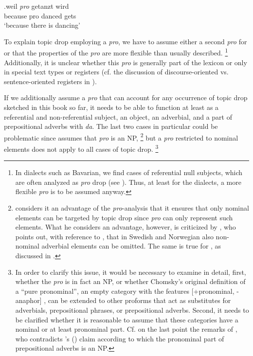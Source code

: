 \exg.\label{ex:pro.sternefeld}weil \emph{pro} getanzt wird\\
because pro danced gets\\
`because there is dancing' \citep[170]{sternefeld2015}

To explain topic drop employing a \textit{pro}, we have to assume either a second \textit{pro} for  or that the properties of the  \textit{pro} are more flexible than usually described.%
\footnote{In  dialects such as Bavarian, we find cases of referential null subjects,  which are often analyzed as \textit{pro} drop (see ).
Thus, at least for the dialects, a more flexible \textit{pro} is to be assumed anyway.}
%
Additionally, it is unclear whether this \textit{pro} is generally part of the lexicon or only in special text types  or registers (cf. the discussion of discourse-oriented vs. sentence-oriented registers in ).

If we additionally assume a \textit{pro} that can account for any occurrence of topic drop sketched in this book so far, it needs to be able to function at least as a referential and non-referential subject, an object, an adverbial,  and a part of prepositional adverbs with \textit{da}.
The last two cases in particular could be problematic since \citet[101]{platzack1996} assumes that \textit{pro} is an NP,%
\footnote{\citet[101]{platzack1996} considers it an advantage of the \textit{pro}-analysis that it ensures that only nominal elements can be targeted by topic drop since \textit{pro} can only represent such elements.
What he considers an advantage, however, is criticized by \citet[38]{nygard2018}, who points out, 	with reference to \citet{mornsjo2002}, that in Swedish  and Norwegian  also non-nominal adverbial  elements can be omitted.
The same is true for , as discussed in .}
%
but a \textit{pro} restricted to nominal elements does not apply to all cases of topic drop.%
\footnote{In order to clarify this issue, it would be necessary to examine in detail, first, whether the \textit{pro} is in fact an NP, or  whether Chomsky's original definition of a ``pure pronominal'', an empty category with the features [+pronominal, -anaphor] \citep[81--82]{chomsky1982}, can be extended to other proforms that act as substitutes for adverbials,   prepositional phrases, or prepositional adverbs. 
Second, it needs to be clarified whether it is reasonable to assume that these categories have a nominal or at least pronominal part.
Cf. on the last point the remarks of \citet[162, footnote 6]{oppenrieder1991}, who contradicts \citeauthor{wunderlich1984}'s (\citeyear[88]{wunderlich1984}) claim according to which the pronominal part of prepositional adverbs is an NP.
}
%

